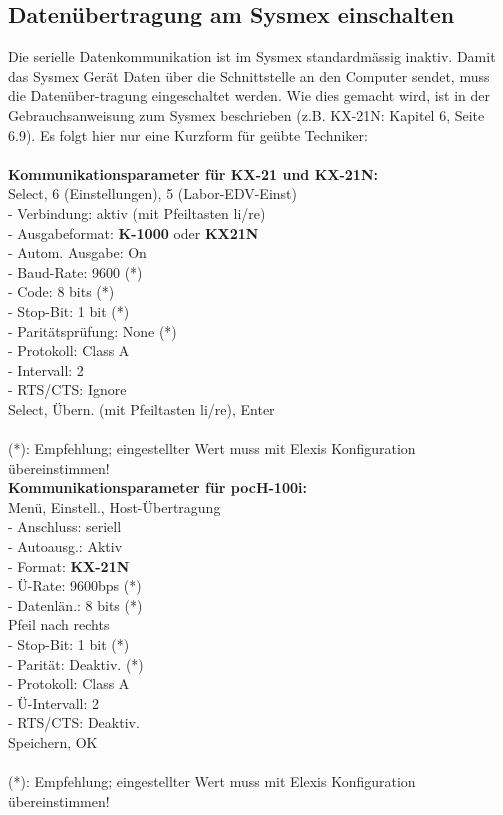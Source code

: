 \documentclass[a4paper]{scrartcl}
\begin{document}
\subsection{Daten\"ubertragung am Sysmex einschalten}
Die serielle Datenkommunikation ist im Sysmex standardm\"assig inaktiv. Damit das Sysmex Ger\"at Daten \"uber die Schnittstelle an den Computer sendet, muss die Daten\"uber-tragung eingeschaltet werden. Wie dies gemacht wird, ist in der Gebrauchsanweisung zum Sysmex beschrieben (z.B. KX-21N: Kapitel 6, Seite 6.9). Es folgt hier nur eine Kurzform f\"ur ge\"ubte Techniker:\\
\\
\textbf{Kommunikationsparameter f\"ur KX-21 und KX-21N:}\\
Select, 6 (Einstellungen), 5 (Labor-EDV-Einst)\\
 - Verbindung: aktiv (mit Pfeiltasten li/re)\\
 - Ausgabeformat: \textbf{K-1000} oder \textbf{KX21N}\\
 - Autom. Ausgabe: On\\
 - Baud-Rate: 9600 (*)\\
 - Code: 8 bits (*)\\
 - Stop-Bit: 1 bit (*)\\
 - Parit\"atspr\"ufung: None (*)\\
 - Protokoll: Class A\\
 - Intervall: 2\\
 - RTS/CTS: Ignore\\
Select, \"Ubern. (mit Pfeiltasten li/re), Enter\\
\\
(*): Empfehlung; eingestellter Wert muss mit Elexis Konfiguration \"ubereinstimmen!\\
\textbf{Kommunikationsparameter f\"ur pocH-100i:}\\
Men\"u, Einstell., Host-\"Ubertragung\\
 - Anschluss: seriell\\
 - Autoausg.: Aktiv\\
 - Format: \textbf{KX-21N}\\
 - \"U-Rate: 9600bps (*)\\
 - Datenl\"an.: 8 bits (*)\\
Pfeil nach rechts\\
 - Stop-Bit: 1 bit (*)\\
 - Parit\"at: Deaktiv. (*)\\
 - Protokoll: Class A\\
 - \"U-Intervall: 2\\
 - RTS/CTS: Deaktiv.\\
Speichern, OK\\
\\
(*): Empfehlung; eingestellter Wert muss mit Elexis Konfiguration \"ubereinstimmen!\\
\\
\end{document}
